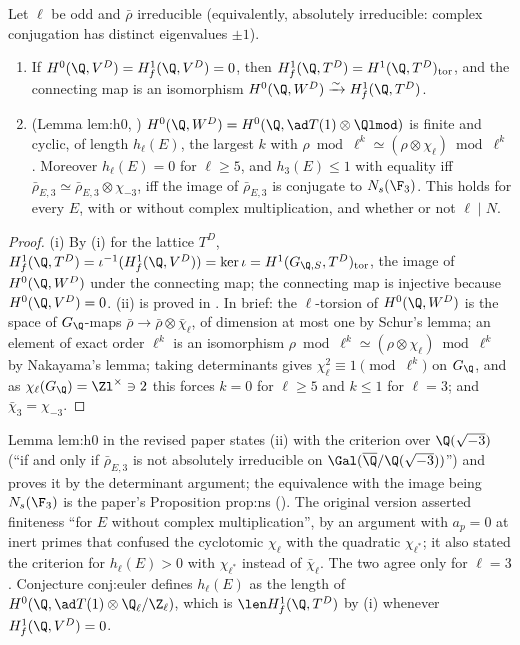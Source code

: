 \begin{proposition}\label{prop:blochkato:h0-selmer}
Let $\ell$ be odd and $\bar\rho$ irreducible (equivalently, absolutely irreducible: complex conjugation has distinct eigenvalues $\pm1$).
\begin{enumerate}[label=(\roman*)]
\item If $H^0(\Q,V^D)=H^1_f(\Q,V^D)=0$, then $H^1_f(\Q,T^D)=H^1(\Q,T^D)_{\mathrm{tor}}$, and the connecting map is an isomorphism $H^0(\Q,W^D)\xrightarrow{\sim}H^1_f(\Q,T^D)$.
\item (Lemma lem:h0, ) $H^0(\Q,W^D)=H^0(\Q,\ad T(1)\otimes\Qlmod)$ is finite and cyclic, of length $h_\ell(E)$, the largest $k$ with $\rho\bmod\ell^k\simeq(\rho\otimes\chi_\ell)\bmod\ell^k$.
Moreover $h_\ell(E)=0$ for $\ell\ge5$, and $h_3(E)\le1$ with equality iff $\bar\rho_{E,3}\simeq\bar\rho_{E,3}\otimes\chi_{-3}$, iff the image of $\bar\rho_{E,3}$ is conjugate to $N_s(\F_3)$. This
holds for every $E$, with or without complex multiplication, and whether or not $\ell\mid N$.
\end{enumerate}
\end{proposition}

\begin{proof}
(i) By (i) for the lattice $T^D$, $H^1_f(\Q,T^D)=\iota^{-1}(H^1_f(\Q,V^D))=\ker\iota=H^1(G_{\Q,S},T^D)_{\mathrm{tor}}$, the image of $H^0(\Q,W^D)$ under the
connecting map; the connecting map is injective because $H^0(\Q,V^D)=0$. (ii) is proved in . In brief: the $\ell$-torsion of $H^0(\Q,W^D)$ is the space of
$G_\Q$-maps $\bar\rho\to\bar\rho\otimes\bar\chi_\ell$, of dimension at most one by Schur's lemma; an element of exact order $\ell^k$ is an isomorphism $\rho\bmod\ell^k\simeq(\rho\otimes\chi_\ell)\bmod\ell^k$ by
Nakayama's lemma; taking determinants gives $\chi_\ell^2\equiv1\pmod{\ell^k}$ on $G_\Q$, and as $\chi_\ell(G_\Q)=\Zl^\times\ni2$ this forces $k=0$ for $\ell\ge5$ and $k\le1$ for $\ell=3$; and
$\bar\chi_3=\chi_{-3}$.
\end{proof}

\begin{paperlink}
Lemma lem:h0 in the revised paper states (ii) with the criterion over $\Q(\sqrt{-3})$ (``if and only if $\bar\rho_{E,3}$ is not absolutely irreducible on
$\Gal(\overline\Q/\Q(\sqrt{-3}))$'') and proves it by the determinant argument; the equivalence with the image being $N_s(\F_3)$ is the paper's Proposition prop:ns
(). The original version asserted finiteness ``for $E$ without complex
multiplication'', by an argument with $a_p=0$ at inert primes that confused the cyclotomic $\chi_\ell$ with the quadratic $\chi_{\ell^*}$; it also stated the criterion for
$h_\ell(E)>0$ with $\chi_{\ell^*}$ instead of $\bar\chi_\ell$. The two agree only for $\ell=3$. Conjecture conj:euler defines $h_\ell(E)$ as the length of
$H^0(\Q,\ad T(1)\otimes\Q_\ell/\Z_\ell)$, which is $\len H^1_f(\Q,T^D)$ by (i) whenever $H^1_f(\Q,V^D)=0$.
\end{paperlink}

